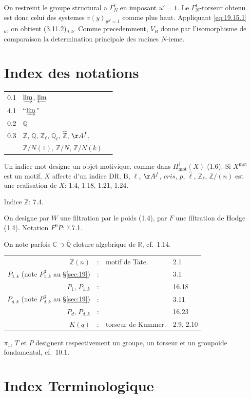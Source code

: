 \documentclass[12pt,a4paper]{article}
\theoremstyle{plain}
\theoremstyle{definition}
\theoremstyle{remark}
\newcommand{\mot}{\mathrm{mot}}
\newcommand{\Betti}{B}
\newcommand{\cris}{cris}
\newcommand{\ZZ}{\mathbb{Z}}
\newcommand{\QQ}{\mathbb{Q}}
\newcommand{\CC}{\mathbb{C}}
\newcommand{\RR}{\mathbb{R}}
\begin{document}
On restreint le groupe structural a $\Gamma_N^1$ en imposant
$u' = 1$. Le $\Gamma_N^1$-torseur obtenu est donc celui des systemes
$v(y)_{y^N=1}$ comme plus haut. Appliquant
\eqref{eq:19.15.1}$_k$, on obtient (3.11.2)$_{d,k}$. Comme
precedemment, $V_\Betti$ donne par l'isomorphisme de comparaison la
determination principale des racines $N$-ieme.


\newpage
\section*{Index des notations}

\begin{tabular}{rll}
0.1 & $\varinjlim$, $\varprojlim$ & \\
4.1 & ``$\varinjlim$'' & \\
0.2 & $\QQ$ & \\
0.3 & $\ZZ$, $\QQ$, $\ZZ_\ell$, $\QQ_\ell$, $\hat{\ZZ}$, $\AA^f$, & \\
& $\ZZ/N(1)$, $\ZZ/N$, $\ZZ/N(k)$ & \\
\end{tabular}

Un indice mot designe un objet motivique, comme dans $H^i_\mot(X)$
(1.6). Si $X^\mot$ est un motif, $X$ affecte d'un indice DR, B,
$\ell$, $\AA^f$, $\cris$, $p$, $\hat{\ell}$, $\ZZ_\ell$, $\ZZ/(n)$ est
une realisation de $X$: 1.4, 1.18, 1.21, 1.24.

Indice $\ZZ$: 7.4.

On designe par $W$ une filtration par le poids (1.4), par $F$ une
filtration de Hodge (1.4). Notation $F^0P$: 7.7.1.

On note parfois $\CC \supset \overline{\QQ}$ cloture algebrique de
$\RR$, cf.\ 1.14.

\begin{tabular}{rlll}
$\ZZ(n)$ &:& motif de Tate. & 2.1 \\
$P_{1,k}$ (note $P^3_{1,k}$ au \S\ref{sec:19}) &:& & 3.1 \\
$P_1$, $P_{1,k}$ &:& & 16.18 \\
$P_{d,k}$ (note $P^3_{d,k}$ au \S\ref{sec:19}) &:& & 3.11 \\
$P_d$, $P_{d,k}$ &:& & 16.23 \\
$K(q)$ &:& torseur de Kummer. & 2.9, 2.10
\end{tabular}

$\pi_1$, $T$ et $P$ designent respectivement un groupe, un torseur et
un groupoide fondamental, cf.\ 10.1.

\newpage
\section*{Index Terminologique}
\end{document}
